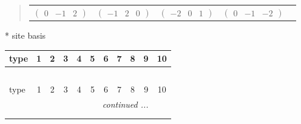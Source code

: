 \documentclass[fleqn,9pt,landscape]{jsarticle}
\begin{document}
\begin{quote}
\begin{tabular}{ccccc}
$ \begin{pmatrix} 0 & -1 & 2 \end{pmatrix} $ & $ \begin{pmatrix} -1 & 2 & 0 \end{pmatrix} $ & $ \begin{pmatrix} -2 & 0 & 1 \end{pmatrix} $ & $ \begin{pmatrix} 0 & -1 & -2 \end{pmatrix} $ & $  $
\end{tabular}
\end{quote}
* site basis
\begin{center}
\renewcommand{\arraystretch}{1.3}
\begin{longtable}{lcccccccccc}
 \hline \hline
type & 1 & 2 & 3 & 4 & 5 & 6 & 7 & 8 & 9 & 10 \\ \hline \endfirsthead

\multicolumn{10}{l}{\tablename\ \thetable{}} \\
 \hline \hline
type & 1 & 2 & 3 & 4 & 5 & 6 & 7 & 8 & 9 & 10 \\ \hline \endhead

 \hline \hline
\multicolumn{10}{r}{\footnotesize\it continued ...} \\ \endfoot

 \hline \hline
\multicolumn{10}{r}{} \\ \endlastfoot


\end{longtable}
\end{center}
\end{document}
